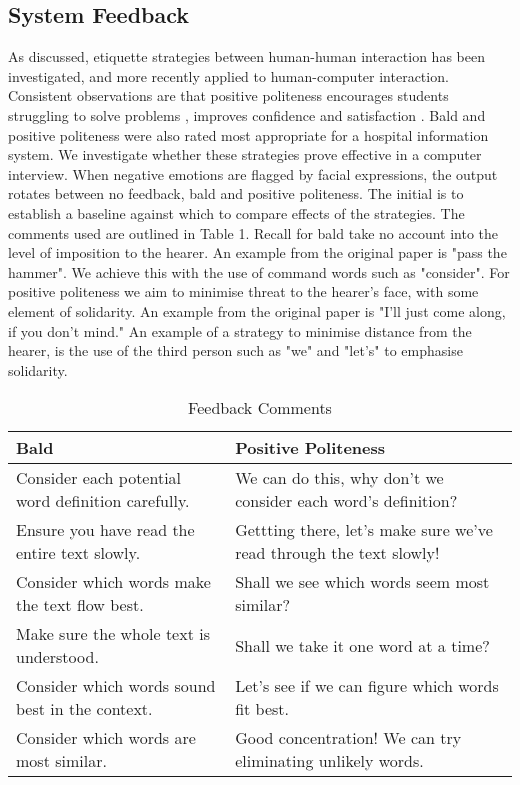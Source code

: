 \documentclass[12pt,a4paper]{article}
\begin{document}
\subsection*{System Feedback}
As discussed, etiquette strategies between human-human interaction has been investigated, and more recently applied to human-computer interaction. Consistent observations are that positive politeness encourages students struggling to solve problems \cite{pearson1995pragmatics}, improves confidence and satisfaction \cite{yang2018evaluating}. Bald and positive politeness were also rated most appropriate for a hospital information system. We investigate whether these strategies prove effective in a computer interview. When negative emotions are flagged by facial expressions, the output rotates between no feedback, bald and positive politeness. The initial is to establish a baseline against which to compare effects of the strategies. The comments used are outlined in Table 1. Recall for bald take no account into the level of imposition to the hearer. An example from the original paper \cite{brown1987politeness} is "pass the hammer". We achieve this with the use of command words such as "consider". For positive politeness we aim to minimise threat to the hearer's face, with some element of solidarity. An example from the original paper is "I'll just come along, if you don't mind." An example of a strategy to minimise distance from the hearer, is the use of the third person such as "we" and "let's" to emphasise solidarity.
	
	\begin{table}[h]
		\centering
		\caption{Feedback Comments}
		\begin{tabularx}{\linewidth}{|l|>{\raggedright\arraybackslash}X|}
			\hline
	 {\bf Bald} & {\bf Positive Politeness} \\ \hline
		Consider each potential word definition carefully. & We can do this, why don’t we consider each word’s definition? \\ \hline
		Ensure you have read the entire text slowly. & Gettting there, let’s make sure we’ve read through the text slowly! \\ \hline
		Consider which words make the text flow best. & Shall we see which words seem most similar?\\ \hline
		Make sure the whole text is understood. &  Shall we take it one word at a time?\\ \hline
		Consider which words sound best in the context. & Let’s see if we can figure which words fit best. \\ \hline
		Consider which words are most similar. & Good concentration! We can try eliminating unlikely words.\\ \hline
\end{tabularx}
\end{table}
\end{document}
